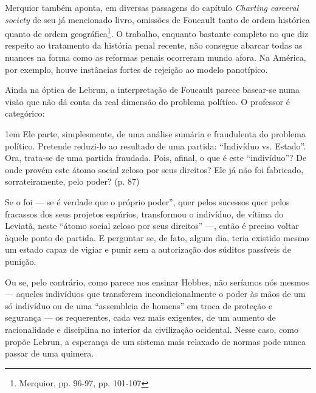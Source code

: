 \documentclass[12pt,a4paper]{article}
\newenvironment{citac}
{
	\begin{addmargin}
		[4cm]{1em} \footnotesize}{\normalfont 
	\end{addmargin}
}
\begin{document}
	Merquior também aponta, em diversas passagens do capítulo 
	\textit{Charting carceral society} de seu já mencionado livro, 
	omissões de Foucault tanto de ordem histórica quanto de ordem 
	geográfica\footnote{Merquior, pp. 96-97, pp. 101-107}. O trabalho, 
	enquanto bastante completo no que diz respeito ao tratamento da 
	história penal recente, não consegue abarcar todas as nuances na 
	forma como as reformas penais ocorreram mundo afora. Na América, 
	por exemplo, houve instâncias fortes de rejeição ao modelo 
	panotípico. 

	Ainda na óptica de Lebrun, a interpretação de Foucault parece basear-se 
	numa visão que não dá conta da real dimensão do problema político. 
	O professor é categórico: 

	\begin{citac}
		Ele parte, simplesmente, de uma análise sumária e fraudulenta 
		do problema político. Pretende reduzi-lo ao resultado de uma 
		partida: “Indivíduo vs. Estado”. Ora, trata-se de uma partida 
		fraudada. Pois, afinal, o que é este “indivíduo”? De onde 
		provém este átomo social zeloso por seus direitos? Ele já não 
		foi fabricado, sorrateiramente, pelo poder? 
		\cite{lebrun} (p. 87)
	\end{citac}

	Se o foi — se é verdade que o próprio poder”, quer pelos sucessos quer 
	pelos fracassos dos seus projetos espúrios, transformou o indivíduo, de 
	vítima do Leviatã, neste “átomo social zeloso por seus direitos” —, então 
	é preciso voltar àquele ponto de partida. E perguntar se, de fato, algum 
	dia, teria existido mesmo um estado capaz de vigiar e punir sem a 
	autorização dos súditos passíveis de punição. 
	
    Ou se, pelo contrário, como parece nos ensinar Hobbes, não seríamos nós 
    mesmos — aqueles indivíduos que transferem incondicionalmente o poder às 
    mãos de um só indivíduo ou de uma “assembleia de homens” em troca de 
    proteção e segurança — os requerentes, cada vez mais exigentes, de um 
    aumento de racionalidade e disciplina no interior da civilização ocidental. 
    Nesse caso, como propõe Lebrun, a esperança de um sistema mais relaxado de
    normas pode nunca passar de uma quimera. 

	
	\vspan
	
	
	
\end{document}
